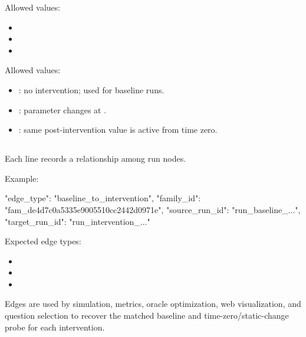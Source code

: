 \documentclass[11pt]{article}
\begin{document}
Allowed  values:

\begin{itemize}
    \item {}
    \item {}
    \item {}
\end{itemize}

Allowed  values:

\begin{itemize}
    \item {}: no intervention; used for baseline runs.
    \item {}: parameter changes at .
    \item {}: same post-intervention value is active from time zero.
\end{itemize}

\subsection*{}

Each line records a relationship among run nodes.

Example:

\begin{DocCode}
{
  "edge_type": "baseline_to_intervention",
  "family_id": "fam_de4d7c0a5335e9005510cc2442d0971e",
  "source_run_id": "run_baseline_...",
  "target_run_id": "run_intervention_..."
}
\end{DocCode}

Expected edge types:

\begin{itemize}
    \item {}
    \item {}
    \item {}
\end{itemize}

Edges are used by simulation, metrics, oracle optimization, web visualization, and question selection to recover the matched baseline and time-zero/static-change probe for each intervention.

\subsection*{}
\end{document}
